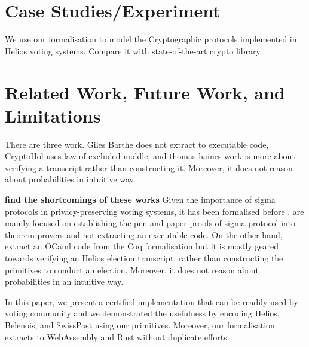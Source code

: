\documentclass[conference,compsoc]{IEEEtran}
\begin{document}
\section{Case Studies/Experiment}
  We use our formalisation to model the Cryptographic protocols implemented in 
  Helios voting systems. Compare it with state-of-the-art 
  crypto library. 


\section{Related Work, Future Work, and Limitations}
  There are three work. Giles Barthe does not extract to executable code, 
  CryptoHol uses law of excluded middle, and thomas haines work is more about 
  verifying a transcript rather than constructing it. Moreover, 
  it does not reason about probabilities in intuitive way. 

\textbf{find the shortcomings of these works}
Given the importance of sigma protocols in privacy-preserving voting systems,
it has been formalised before  \cite{5552642,butler2019formalisation,10.1145/3319535.3354247}. 
\cite{5552642,butler2019formalisation} are mainly focused on establishing the 
pen-and-paper proofs of sigma protocol into theorem provers and not extracting an executable code.
On the other hand, \cite{10.1145/3319535.3354247} extract an OCaml code from the Coq 
formalisation but it is mostly geared towards verifying an Helios election transcript, 
rather than constructing the primitives to conduct an election. Moreover, 
it does not reason about probabilities in an intuitive way.


  In this paper, we present a certified implementation 
  that can be readily used by voting community and 
  we demonstrated the usefulness by encoding Helios, 
  Belenois, and SwissPost using our primitives. 
  Moreover, our formalisation extracts to WebAssembly and 
  Rust without duplicate efforts. 









\end{document}

